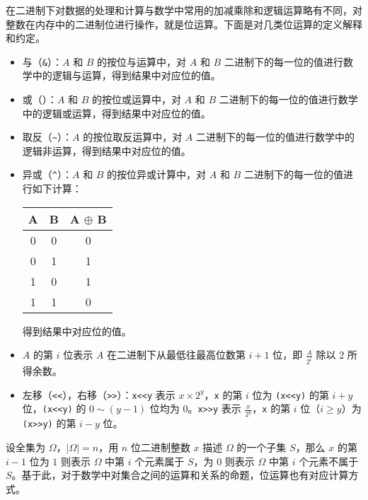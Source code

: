 \documentclass[a4paper, UTF8]{ctexart}
\begin{document}
在二进制下对数据的处理和计算与数学中常用的加减乘除和逻辑运算略有不同，对整数在内存中的二进制位进行操作，就是位运算。下面是对几类位运算的定义解释和约定。

\begin{itemize}
\tightlist
\item
  与（\texttt{\&}）：\(A\) 和 \(B\) 的按位与运算中，对 \(A\) 和 \(B\)
  二进制下的每一位的值进行数学中的逻辑与运算，得到结果中对应位的值。
\item
  或（\texttt{\textbar{}}）：\(A\) 和 \(B\) 的按位或运算中，对 \(A\) 和
  \(B\)
  二进制下的每一位的值进行数学中的逻辑或运算，得到结果中对应位的值。
\item
  取反（\texttt{\textasciitilde{}}）：\(A\) 的按位取反运算中，对 \(A\)
  二进制下的每一位的值进行数学中的逻辑非运算，得到结果中对应位的值。
\item
  异或（\texttt{\^{}}）：\(A\) 和 \(B\) 的按位异或计算中，对 \(A\) 和
  \(B\) 二进制下的每一位的值进行如下计算：


  \begin{longtable}[]{@{}ccc@{}}
  \toprule
  A & B & A \(\oplus\) B \\
  \midrule
  \endhead
  0 & 0 & 0 \\
  0 & 1 & 1 \\
  1 & 0 & 1 \\
  1 & 1 & 0 \\
  \bottomrule
  \end{longtable}

  得到结果中对应位的值。
\item
  \(A\) 的第 \(i\) 位表示 \(A\) 在二进制下从最低往最高位数第 \(i+1\)
  位，即 \(\frac{A}{2^i}\) 除以 \(2\) 所得余数。
\item
  左移（\texttt{\textless{}\textless{}}），右移（\texttt{\textgreater{}\textgreater{}}）：\texttt{x\textless{}\textless{}y}
  表示 \(x\times 2^y\)，\texttt{x} 的第 \(i\) 位为
  \texttt{(x\textless{}\textless{}y)} 的第 \(i+y\)
  位，\texttt{(x\textless{}\textless{}y)} 的 \(0\sim (y-1)\) 位均为
  \(0\)。\texttt{x\textgreater{}\textgreater{}y} 表示
  \(\frac{x}{2^y}\)，\texttt{x} 的第 \(i\) 位（\(i\ge y\)）为
  \texttt{(x\textgreater{}\textgreater{}y)} 的第 \(i-y\) 位。
\end{itemize}

设全集为 \(\Omega\)，\(|\Omega|=n\)，用 \(n\) 位二进制整数 \(x\) 描述
\(\Omega\) 的一个子集 \(S\)，那么 \(x\) 的第 \(i-1\) 位为 \(1\) 则表示
\(\Omega\) 中第 \(i\) 个元素属于 \(S\)，为 \(0\) 则表示 \(\Omega\) 中第
\(i\) 个元素不属于
\(S\)。基于此，对于数学中对集合之间的运算和关系的命题，位运算也有对应计算方式。
\end{document}
